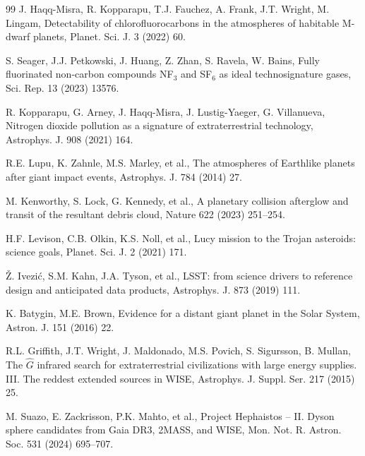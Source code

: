 \documentclass[preprint,12pt]{elsarticle}
\theoremstyle{definition}
\begin{document}
\begin{thebibliography}{99}
 J. Haqq-Misra, R. Kopparapu, T.J. Fauchez, A. Frank, J.T. Wright, M. Lingam, Detectability of chlorofluorocarbons in the atmospheres of habitable M-dwarf planets, Planet. Sci. J. 3 (2022) 60.

 S. Seager, J.J. Petkowski, J. Huang, Z. Zhan, S. Ravela, W. Bains, Fully fluorinated non-carbon compounds NF$_3$ and SF$_6$ as ideal technosignature gases, Sci. Rep. 13 (2023) 13576.

 R. Kopparapu, G. Arney, J. Haqq-Misra, J. Lustig-Yaeger, G. Villanueva, Nitrogen dioxide pollution as a signature of extraterrestrial technology, Astrophys. J. 908 (2021) 164.

 R.E. Lupu, K. Zahnle, M.S. Marley, et al., The atmospheres of Earthlike planets after giant impact events, Astrophys. J. 784 (2014) 27.

 M. Kenworthy, S. Lock, G. Kennedy, et al., A planetary collision afterglow and transit of the resultant debris cloud, Nature 622 (2023) 251--254.

 H.F. Levison, C.B. Olkin, K.S. Noll, et al., Lucy mission to the Trojan asteroids: science goals, Planet. Sci. J. 2 (2021) 171.

 \v{Z}. Ivezi\'c, S.M. Kahn, J.A. Tyson, et al., LSST: from science drivers to reference design and anticipated data products, Astrophys. J. 873 (2019) 111.

 K. Batygin, M.E. Brown, Evidence for a distant giant planet in the Solar System, Astron. J. 151 (2016) 22.

 R.L. Griffith, J.T. Wright, J. Maldonado, M.S. Povich, S. Sigur{\dh}sson, B. Mullan, The $\hat{G}$ infrared search for extraterrestrial civilizations with large energy supplies. III. The reddest extended sources in WISE, Astrophys. J. Suppl. Ser. 217 (2015) 25.

 M. Suazo, E. Zackrisson, P.K. Mahto, et al., Project Hephaistos -- II. Dyson sphere candidates from Gaia DR3, 2MASS, and WISE, Mon. Not. R. Astron. Soc. 531 (2024) 695--707.

\end{thebibliography}
\end{document}
